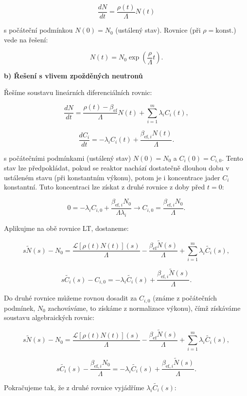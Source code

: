 $$ \dfrac{dN}{dt} = \dfrac{\rho (t)}{\Lambda} N(t) $$

s počáteční podmínkou $N(0) = N_0$ (ustálený stav). Rovnice (při $\rho = \text{konst.}$) vede na řešení:

\begin{equation}
  \boxed{
  N(t) = N_0 \exp \left ( \dfrac{\rho}{\Lambda} t \right ).
  \label{kinetika_reseni}}
\end{equation}

\textbf{b) Řešení s vlivem zpožděných neutronů}

Řešíme soustavu lineárních diferenciálních rovnic:

$$ \dfrac{dN}{dt} = \dfrac{\rho(t) - \beta_{\text{ef}}}{\Lambda} N(t) + \sum_{i=1}^m \lambda_i C_i(t), $$

$$ \dfrac{dC_i}{dt} = -\lambda_i C_i(t) + \dfrac{\beta_{\text{ef},i}  N(t)}{\Lambda}. $$

s počátečními podmínkami (ustálený stav) $N(0) = N_0$ a $C_i(0) = C_{i,0}$. Tento stav lze předpokládat, pokud se reaktor nachází dostatečně dlouhou dobu v ustáleném stavu (při konstantním výkonu), potom je i koncentrace jader $C_i$ konstantní. Tuto koncentraci lze získat z druhé rovnice z doby před $t=0$:

$$ 0 = -\lambda_i C_{i,0} + \dfrac{\beta_{\text{ef},i}  N_0}{\Lambda \lambda_i} \rightarrow C_{i,0} = \dfrac{\beta_{\text{ef},i}  N_0}{\Lambda}. $$

Aplikujme na obě rovnice LT, dostaneme:

$$ s \tilde{N}(s) - N_0 = \dfrac{\mathcal{L}[\rho(t) N(t)](s)}{\Lambda} - \dfrac{\beta_{\text{ef}} \tilde{N}(s)}{\Lambda} + \sum_{i=1}^m \lambda_i \tilde{C_i}(s), $$

$$ s \tilde{C_i}(s) - C_{i,0} = -\lambda_i \tilde{C_i}(s) + \dfrac{\beta_{\text{ef},i}  \tilde{N}(s)}{\Lambda}. $$

Do druhé rovnice můžeme rovnou dosadit za $C_{i,0}$ (známe z počátečních podmínek, $N_0$ zachováváme, to získáme z normalizace výkonu), čímž získáváme soustavu algebraických rovnic:

$$ s \tilde{N}(s) - N_0 = \dfrac{\mathcal{L}[\rho(t) N(t)](s)}{\Lambda} - \dfrac{\beta_{\text{ef}} \tilde{N}(s)}{\Lambda} + \sum_{i=1}^m \lambda_i \tilde{C_i}(s), $$

$$ s \tilde{C_i}(s) - \dfrac{\beta_{\text{ef},i}  N_0}{\Lambda} = -\lambda_i \tilde{C_i}(s) + \dfrac{\beta_{\text{ef},i}  \tilde{N}(s)}{\Lambda}. $$

Pokračujeme tak, že z druhé rovnice vyjádříme $\lambda_i \tilde{C_i}(s)$:

